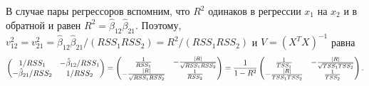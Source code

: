 \documentclass[12pt]{article}
\DeclarePairedDelimiter{\abs}{\lvert}{\rvert}
\newcommand{\hb}{\hat{\beta}}
\begin{document}
В случае пары регрессоров вспомним, что $R^2$ одинаков в регрессии $x_1$ на $x_2$ и в обратной и равен $R^2 = \hb_{12} \hb_{21}$.
Поэтому, $v_{12}^2 = v_{21}^2 = \hb_{12}\hb_{21} / (RSS_1 RSS_2) = R^2 / (RSS_1 RSS_2)$ и $V = (X^TX)^{-1}$ равна
\[
\begin{pmatrix}
    1/RSS_1 & -{\hb_{12}}/{RSS_1} \\
    - {\hb_{21}}/{RSS_2} & 1/RSS_2 \\
\end{pmatrix}  = 
\begin{pmatrix}
    \frac{1}{RSS_1} & -\frac{\abs{R}}{\sqrt{RSS_1 RSS_2}} \\
    -\frac{\abs{R}}{\sqrt{RSS_1 RSS_2}} & \frac{1}{RSS_2} \\
\end{pmatrix} = 
\frac{1}{1 - R^2}
\begin{pmatrix}
    \frac{1}{TSS_1} & -\frac{\abs{R}}{\sqrt{TSS_1 TSS_2}} \\
    -\frac{\abs{R}}{TSS_1 TSS_2} & \frac{1}{TSS_2} \\
\end{pmatrix}. 
\]
\end{document}
